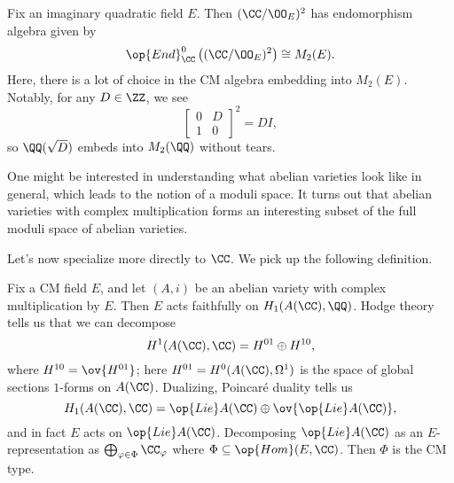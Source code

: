 \documentclass[../notes.tex]{subfiles}
\begin{document}
\begin{example}
	Fix an imaginary quadratic field $E$. Then $(\CC/\OO_E)^2$ has endomorphism algebra given by
	\[\op{End}^0_\CC\left((\CC/\OO_E)^2\right)\cong M_2(E).\]
	Here, there is a lot of choice in the CM algebra embedding into $M_2(E)$. Notably, for any $D\in\ZZ$, we see
	\[\begin{bmatrix}
		0 & D \\
		1 & 0
	\end{bmatrix}^2=DI,\]
	so $\QQ(\sqrt D)$ embeds into $M_2(\QQ)$ without tears.
\end{example}
\begin{remark}
	One might be interested in understanding what abelian varieties look like in general, which leads to the notion of a moduli space. It turns out that abelian varieties with complex multiplication forms an interesting subset of the full moduli space of abelian varieties.
\end{remark}
Let's now specialize more directly to $\CC$. We pick up the following definition.
\begin{definition}[CM type]
	Fix a CM field $E$, and let $(A,i)$ be an abelian variety with complex multiplication by $E$. Then $E$ acts faithfully on $H_1(A(\CC),\QQ)$. Hodge theory tells us that we can decompose
	\[H^1(A(\CC),\CC)=H^{01}\oplus H^{10},\]
	where $H^{10}=\ov{H^{01}}$; here $H^{01}=H^0(A(\CC),\Omega^1)$ is the space of global sections $1$-forms on $A(\CC)$. Dualizing, Poincar\'e duality tells us
	\[H_1(A(\CC),\CC)=\op{Lie}A(\CC)\oplus\ov{\op{Lie}A(\CC)},\]
	and in fact $E$ acts on $\op{Lie}A(\CC)$. Decomposing $\op{Lie}A(\CC)$ as an $E$-representation as $\bigoplus_{\varphi\in\Phi}\CC_\varphi$ where $\Phi\subseteq\op{Hom}(E,\CC)$. Then $\Phi$ is the CM type.
\end{definition}
\end{document}
